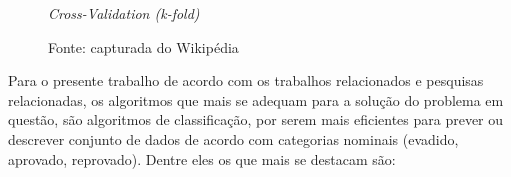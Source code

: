 \begin{figure}[!ht]
\caption{\textit{Cross-Validation (k-fold)}}
\centering
{}
\caption*{Fonte: capturada do Wikipédia}
\label{fig:kfold}
\end{figure}

Para o presente trabalho de acordo com os trabalhos relacionados e pesquisas relacionadas, os algoritmos que mais se adequam para a solução do problema em questão, são algoritmos de classificação, por serem mais eficientes para prever ou descrever conjunto de dados de acordo com categorias nominais (evadido, aprovado, reprovado). Dentre eles os que mais se destacam são:

